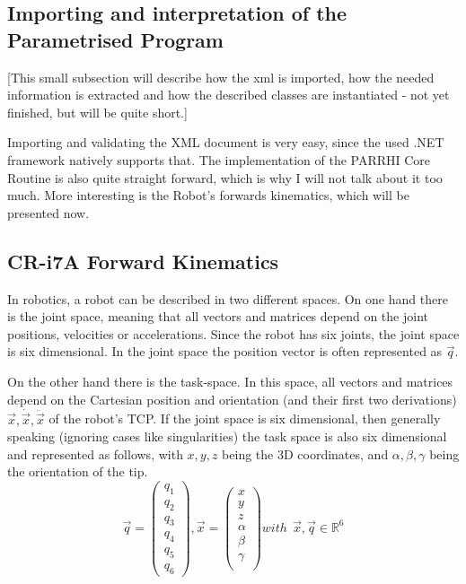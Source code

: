 \subsection{Importing and interpretation of the Parametrised Program}
[This small subsection will describe how the xml is imported, how the needed information is extracted and how the described classes are instantiated - not yet finished, but will be quite short.]

Importing and validating the XML document is very easy, since the used .NET framework natively supports that. The implementation of the PARRHI Core Routine is also quite straight forward, which is why I will not talk about it too much. More interesting is the Robot's forwards kinematics, which will be presented now.

\subsection{CR-i7A Forward Kinematics}
In robotics, a robot can be described in two different spaces. On one hand there is the joint space, meaning that all vectors and matrices depend on the joint positions, velocities or accelerations. Since the robot has six joints, the joint space is six dimensional. In the joint space the position vector is often represented as $ \vec{q} $.

On the other hand there is the task-space. In this space, all vectors and matrices depend on the Cartesian position and orientation (and their first two derivations) $ \vec{x}, \dot{\vec{x}}, \ddot{\vec{x}} $ of the robot's TCP. If the joint space is six dimensional, then generally speaking (ignoring cases like singularities) the task space is also six dimensional and represented as follows, with $x,y,z$ being the 3D coordinates, and $\alpha, \beta, \gamma $ being the orientation of the tip.
\[ \vec{q} = \begin{pmatrix} q_1 \\ q_2 \\ q_3 \\ q_4 \\ q_5 \\ q_6 \end{pmatrix}, \vec{x} = \begin{pmatrix} x \\ y \\ z \\ \alpha \\ \beta \\ \gamma \\ \end{pmatrix} with~~\vec{x},\vec{q} \in \mathbb{R}^6  \]

